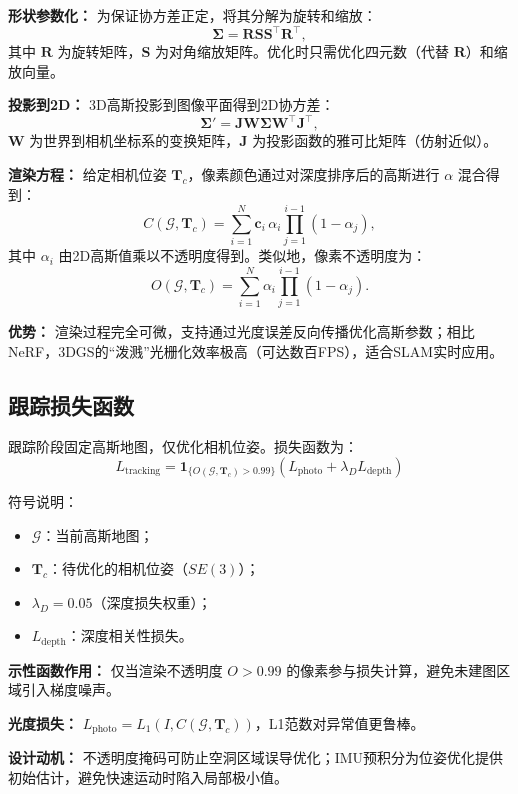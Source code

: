\documentclass[12pt,a4paper,onecolumn]{article}
\begin{document}
\textbf{形状参数化：} 为保证协方差正定，将其分解为旋转和缩放：
\[
\boldsymbol{\Sigma} = \mathbf{R} \mathbf{S} \mathbf{S}^\top \mathbf{R}^\top,
\]
其中 $\mathbf{R}$ 为旋转矩阵，$\mathbf{S}$ 为对角缩放矩阵。优化时只需优化四元数（代替 $\mathbf{R}$）和缩放向量。

\textbf{投影到2D：} 3D高斯投影到图像平面得到2D协方差：
\[
\boldsymbol{\Sigma}' = \mathbf{J} \mathbf{W} \boldsymbol{\Sigma} \mathbf{W}^\top \mathbf{J}^\top,
\]
$\mathbf{W}$ 为世界到相机坐标系的变换矩阵，$\mathbf{J}$ 为投影函数的雅可比矩阵（仿射近似）。

\textbf{渲染方程：} 给定相机位姿 $\mathbf{T}_c$，像素颜色通过对深度排序后的高斯进行 $\alpha$ 混合得到：
\[
C(\mathcal{G}, \mathbf{T}_c) = \sum_{i=1}^{N} \mathbf{c}_i \, \alpha_i \prod_{j=1}^{i-1} (1 - \alpha_j),
\]
其中 $\alpha_i$ 由2D高斯值乘以不透明度得到。类似地，像素不透明度为：
\[
O(\mathcal{G}, \mathbf{T}_c) = \sum_{i=1}^{N} \alpha_i \prod_{j=1}^{i-1} (1 - \alpha_j).
\]

\textbf{优势：} 渲染过程完全可微，支持通过光度误差反向传播优化高斯参数；相比NeRF，3DGS的“泼溅”光栅化效率极高（可达数百FPS），适合SLAM实时应用。

\subsection{跟踪损失函数}

跟踪阶段固定高斯地图，仅优化相机位姿。损失函数为：
\[
L_{\text{tracking}} = \mathbf{1}_{\{O(\mathcal{G}, \mathbf{T}_c) > 0.99\}} \left( L_{\text{photo}} + \lambda_D L_{\text{depth}} \right)
\]

符号说明：
\begin{itemize}
    \item $\mathcal{G}$：当前高斯地图；
    \item $\mathbf{T}_c$：待优化的相机位姿（$SE(3)$）；
    \item $\lambda_D = 0.05$（深度损失权重）；
    \item $L_{\text{depth}}$：深度相关性损失。
\end{itemize}

\textbf{示性函数作用：} 仅当渲染不透明度 $O>0.99$ 的像素参与损失计算，避免未建图区域引入梯度噪声。

\textbf{光度损失：} $L_{\text{photo}} = L_1(I, C(\mathcal{G}, \mathbf{T}_c))$，L1范数对异常值更鲁棒。

\textbf{设计动机：} 不透明度掩码可防止空洞区域误导优化；IMU预积分为位姿优化提供初始估计，避免快速运动时陷入局部极小值。
\end{document}
